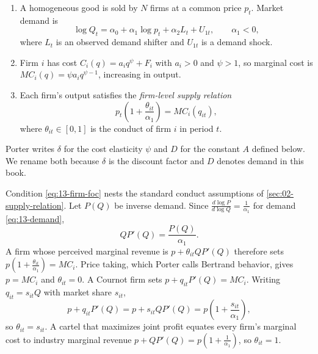 \begin{assumption}\label{asm:13-porter}
\leavevmode
\begin{enumerate}[label=(\alph*)]
\item A homogeneous good is sold by $N$ firms at a common price $p_t$. Market demand is
\begin{equation}\label{eq:13-demand}
  \log Q_t = \alpha_0 + \alpha_1 \log p_t + \alpha_2 L_t + U_{1t}, \qquad \alpha_1 < 0,
\end{equation}
where $L_t$ is an observed demand shifter and $U_{1t}$ is a demand shock.
\item Firm $i$ has cost $C_i(q) = a_i q^{\psi} + F_i$ with $a_i > 0$ and $\psi > 1$, so marginal cost is
$MC_i(q) = \psi a_i q^{\psi - 1}$, increasing in output.
\item Each firm's output satisfies the \emph{firm-level supply relation}
\begin{equation}\label{eq:13-firm-foc}
  p_t\left(1 + \frac{\theta_{it}}{\alpha_1}\right) = MC_i(q_{it}),
\end{equation}
where $\theta_{it} \in [0,1]$ is the conduct of firm $i$ in period $t$.
\end{enumerate}
\end{assumption}

Porter writes $\delta$ for the cost elasticity $\psi$ and $D$ for the constant $A$ defined below. We rename both
because $\delta$ is the discount factor and $D$ denotes demand in this book.

Condition \eqref{eq:13-firm-foc} nests the standard conduct assumptions of \cref{sec:02-supply-relation}. Let
$P(Q)$ be inverse demand. Since $\frac{d \log P}{d \log Q} = \frac{1}{\alpha_1}$ for demand \eqref{eq:13-demand},
\begin{equation*}
  Q P'(Q) = \frac{P(Q)}{\alpha_1}.
\end{equation*}
A firm whose perceived marginal revenue is $p + \theta_{it} Q P'(Q)$ therefore sets
$p(1 + \frac{\theta_{it}}{\alpha_1}) = MC_i$. Price taking, which Porter calls Bertrand behavior, gives $p = MC_i$ and
$\theta_{it} = 0$. A Cournot firm sets $p + q_{it}P'(Q) = MC_i$. Writing $q_{it} = s_{it} Q$ with market share
$s_{it}$,
\begin{equation*}
  p + q_{it}P'(Q) = p + s_{it} Q P'(Q) = p\left(1 + \frac{s_{it}}{\alpha_1}\right),
\end{equation*}
so $\theta_{it} = s_{it}$. A cartel that maximizes joint profit equates every firm's marginal cost to industry
marginal revenue $p + QP'(Q) = p(1 + \frac{1}{\alpha_1})$, so $\theta_{it} = 1$.

